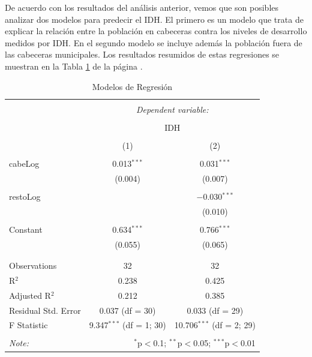 \documentclass{article}
\begin{document}
De acuerdo con los resultados del análisis anterior, vemos que son posibles analizar dos modelos para predecir el IDH. El primero es un modelo que trata de explicar la relación entre la población en cabeceras contra los niveles de desarrollo medidos por IDH. En el segundo modelo se incluye además la población fuera de las cabeceras municipales. Los resultados resumidos de estas regresiones se muestran en la Tabla \ref{regresiones} de la página \pageref{regresiones}.



\begin{table}[!htbp] \centering 
  \caption{Modelos de Regresión} 
  \label{regresiones} 
\begin{tabular}{@{\extracolsep{5pt}}lcc} 
\\[-1.8ex]\hline 
\hline \\[-1.8ex] 
 & \multicolumn{2}{c}{\textit{Dependent variable:}} \\ 
\cline{2-3} 
\\[-1.8ex] & \multicolumn{2}{c}{IDH} \\ 
\\[-1.8ex] & (1) & (2)\\ 
\hline \\[-1.8ex] 
 cabeLog & 0.013$^{***}$ & 0.031$^{***}$ \\ 
  & (0.004) & (0.007) \\ 
  & & \\ 
 restoLog &  & $-$0.030$^{***}$ \\ 
  &  & (0.010) \\ 
  & & \\ 
 Constant & 0.634$^{***}$ & 0.766$^{***}$ \\ 
  & (0.055) & (0.065) \\ 
  & & \\ 
\hline \\[-1.8ex] 
Observations & 32 & 32 \\ 
R$^{2}$ & 0.238 & 0.425 \\ 
Adjusted R$^{2}$ & 0.212 & 0.385 \\ 
Residual Std. Error & 0.037 (df = 30) & 0.033 (df = 29) \\ 
F Statistic & 9.347$^{***}$ (df = 1; 30) & 10.706$^{***}$ (df = 2; 29) \\ 
\hline 
\hline \\[-1.8ex] 
\textit{Note:}  & \multicolumn{2}{r}{$^{*}$p$<$0.1; $^{**}$p$<$0.05; $^{***}$p$<$0.01} \\ 
\end{tabular} 
\end{table} 
\end{document}
